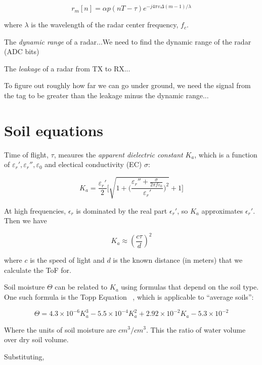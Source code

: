 \documentclass[12pt]{article}
\begin{document}
\begin{equation}
r_m[n] =  \alpha p(nT - \tau)e^{-j4\pi v \Delta(m-1)/\lambda}  
\end{equation}

where $\lambda$ is the wavelength of the radar center frequency,
$f_c$.

The \emph{dynamic range} of a radar...We need to find the dynamic
range of the radar (ADC bits)

The \emph{leakage} of a radar from TX to RX...

To figure out roughly how far we can go under ground, we need the
signal from the tag to be greater than the leakage minus the dynamic
range...


\section*{Soil equations}
Time of flight, $\tau$, meaures the \emph{apparent dielectric
  constant} $K_a$, which is a function of
$\varepsilon_r', \varepsilon_r'', \varepsilon_0$ and electical conductivity (EC)
$\sigma$:

\begin{equation}
  K_a = \frac{\varepsilon_r'}{2}\Bigg[\sqrt{1+\bigg(\frac{\varepsilon_r'' + \frac{\sigma}{2\pi f\varepsilon_0}}{\varepsilon_r'}\bigg)^2}+1\Bigg]  
\end{equation}

At high frequencies, $\epsilon_r$ is dominated by the real part
$\epsilon_r'$, so $K_a$ approximates $\epsilon_r'$. Then we have

\begin{equation}
K_a \approx (\frac{c\tau}{d})^2
\end{equation}

where $c$ is the speed of light and $d$ is the known distance (in
meters) that we calculate the ToF for.

Soil moisture $\Theta$ can be related to $K_a$ using formulas that depend on the soil type. One such formula is the Topp Equation ~\cite{Topp1980}, which is applicable to ``average soils'':

\begin{equation}
  \Theta = 4.3\times 10^{-6}K_a^3-5.5\times10^{-4}K_a^2+2.92\times 10^{-2}K_a-5.3\times 10^{-2}
\end{equation}

Where the units of soil moisture are $cm^3/cm^3$. This the ratio of water volume over dry soil volume.

Substituting,
\end{document}
